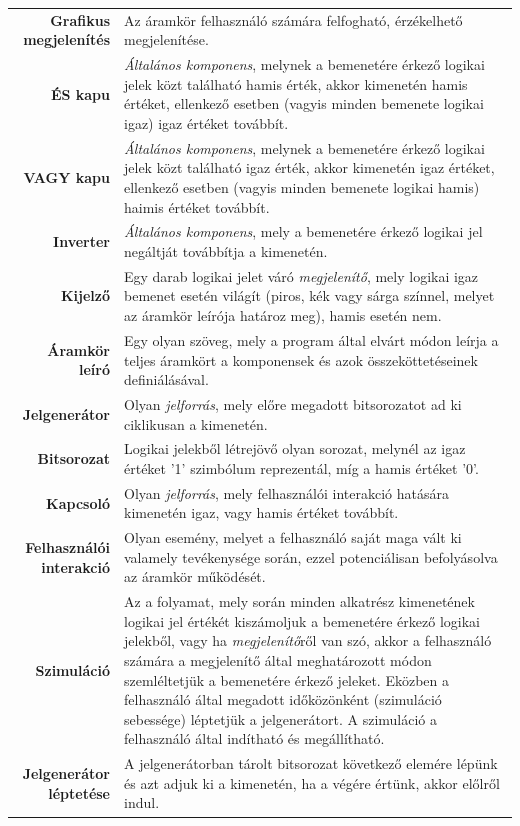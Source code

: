 \begin{longtable}{r p{10.7cm}}
\textbf{Grafikus megjelenítés} & Az áramkör felhasználó számára felfogható, érzékelhető megjelenítése.\\
\textbf{ÉS kapu} & \emph{Általános komponens}, melynek a bemenetére érkező logikai jelek közt található hamis érték, akkor kimenetén hamis értéket, ellenkező esetben (vagyis minden bemenete logikai igaz) igaz értéket továbbít. \\
\textbf{VAGY kapu} & \emph{Általános komponens}, melynek a bemenetére érkező logikai jelek közt található igaz érték, akkor kimenetén igaz értéket, ellenkező esetben (vagyis minden bemenete logikai hamis) haimis értéket továbbít. \\
\textbf{Inverter} & \emph{Általános komponens}, mely a bemenetére érkező logikai jel negáltját továbbítja a kimenetén. \\
\textbf{Kijelző} & Egy darab logikai jelet váró \emph{megjelenítő}, mely logikai igaz bemenet esetén világít (piros, kék vagy sárga színnel, melyet az áramkör leírója határoz meg), hamis esetén nem. \\
\textbf{Áramkör leíró} & Egy olyan szöveg, mely a program által elvárt módon leírja a teljes áramkört a komponensek és azok összeköttetéseinek definiálásával. \\
\textbf{Jelgenerátor} & Olyan \emph{jelforrás}, mely előre megadott bitsorozatot ad ki ciklikusan a kimenetén.\\
\textbf{Bitsorozat} & Logikai jelekből létrejövő olyan sorozat, melynél az igaz értéket ’1’ szimbólum reprezentál, míg a hamis értéket ’0’.\\
\textbf{Kapcsoló} & Olyan \emph{jelforrás}, mely felhasználói interakció hatására kimenetén igaz, vagy hamis értéket továbbít. \\
\textbf{Felhasználói interakció} & Olyan esemény, melyet a felhasználó saját maga vált ki valamely tevékenysége során, ezzel potenciálisan befolyásolva az áramkör működését. \\
\textbf{Szimuláció} & Az a folyamat, mely során minden alkatrész kimenetének logikai jel értékét kiszámoljuk a bemenetére érkező logikai jelekből, vagy ha \emph{megjelenítő}ről van szó, akkor a felhasználó számára a megjelenítő által meghatározott módon szemléltetjük a bemenetére érkező jeleket. Eközben a felhasználó által megadott időközönként (szimuláció sebessége) léptetjük a jelgenerátort. A szimuláció a felhasználó által indítható és megállítható.\\
\textbf{Jelgenerátor léptetése} & A jelgenerátorban tárolt bitsorozat következő elemére lépünk és azt adjuk ki a kimenetén, ha a végére értünk, akkor előlről indul.\\

\end{longtable}
